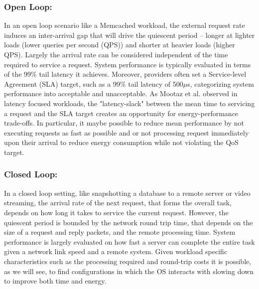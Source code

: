 \subsubsection{Open Loop:}
\label{sec:workflow:openloop}
In an open loop scenario like a Memcached workload, the external request rate induces an inter-arrival gap that will drive the quiescent period -- longer at lighter loads (lower queries per second (QPS)) and shorter at heavier loads (higher QPS). Largely the arrival rate can be considered independent of the time required to service a request.  System performance is typically evaluated in terms of the 99\% tail latency it achieves.  Moreover, providers often set a Service-level Agreement (SLA) target, such as a 99\% tail latency of 500${\mu}$s, categorizing system performance into acceptable and unacceptable.  As Mootaz et al.\cite{mootaz} observed in latency focused workloads, the "latency-slack" between the mean time to servicing a request and the SLA target creates an opportunity for energy-performance trade-offs.  In particular, it maybe possible to reduce mean performance by not executing requests as fast as possible and or not processing request immediately upon their arrival to reduce energy consumption while not violating the QoS target.  

\subsubsection{Closed Loop:}
\label{sec:workflow:closed_loop}
In a closed loop setting, like snapshotting a database to a remote server or video streaming, the arrival rate of the next request, that forms the overall task, depends on how long it takes to service the current request.  However, the quiescent period is bounded by the network round trip time, that depends on  the size of a request and reply packets, and the remote processing time. System performance is largely evaluated on how fast a server can complete the entire task given a network link speed and a remote system.  Given workload specific characteristics such as the processing required and round-trip costs it is possible, as we will see, to find configurations in which the OS interacts with slowing down to improve both time and energy. 


